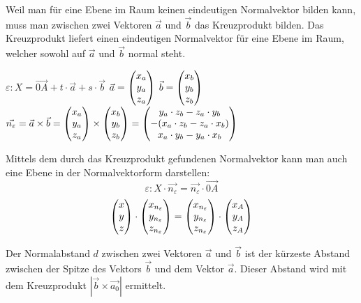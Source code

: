 Weil man f\"{u}r eine Ebene im Raum keinen eindeutigen Normalvektor bilden kann, muss man zwischen zwei Vektoren $\vec{a}$ und $\vec{b}$ das Kreuzprodukt bilden. Das Kreuzprodukt liefert einen eindeutigen Normalvektor f\"{u}r eine Ebene im Raum, welcher sowohl auf $\vec{a}$ und $\vec{b}$ normal steht.

\begin{center}
  $\varepsilon: X = \vec{0A} + t \cdot \vec{a} + s \cdot \vec{b}$
  \extrapar
  $ \vec{a} = \begin{pmatrix}x_{a}\\y_{a}\\z_{a}\end{pmatrix}$
  \extrapar
  $ \vec{b} = \begin{pmatrix}x_{b}\\y_{b}\\z_{b}\end{pmatrix}$
  \extrapar
  $ \vec{n_{\varepsilon}} 
    = \vec{a} \times \vec{b} 
    = \begin{pmatrix}x_{a}\\y_{a}\\z_{a}\end{pmatrix} \times \begin{pmatrix}x_{b}\\y_{b}\\z_{b}\end{pmatrix} 
    = \begin{pmatrix}y_{a} \cdot z_{b} - z_{a} \cdot y_{b}\\ - (x_{a} \cdot z_{b} - z_{a} \cdot x_{b})\\x_{a} \cdot y_{b} - y_{a} \cdot x_{b}\end{pmatrix}$  
\end{center}

\pagebreak


Mittels dem durch das Kreuzprodukt gefundenen Normalvektor kann man auch eine Ebene in der Normalvektorform darstellen: $$\varepsilon: X \cdot \vec{n_{\varepsilon}} = \vec{n_{\varepsilon}} \cdot \vec{0A}$$ $$\begin{pmatrix}x \\ y \\ z\end{pmatrix} \cdot \begin{pmatrix}x_{n_{\varepsilon}} \\ y_{n_{\varepsilon}} \\ z_{n_{\varepsilon}}\end{pmatrix} = \begin{pmatrix}x_{n_{\varepsilon}} \\ y_{n_{\varepsilon}} \\ z_{n_{\varepsilon}}\end{pmatrix} \cdot \begin{pmatrix}x_{A} \\ y_{A} \\ z_{A}\end{pmatrix}$$


Der Normalabstand $d$ zwischen zwei Vektoren $\vec{a}$ und $\vec{b}$ ist der k\"{u}rzeste Abstand zwischen der Spitze des Vektors $\vec{b}$ und dem Vektor $\vec{a}$. Dieser Abstand wird mit dem Kreuzprodukt $|\vec{b} \times \vec{a_0}|$ ermittelt.

